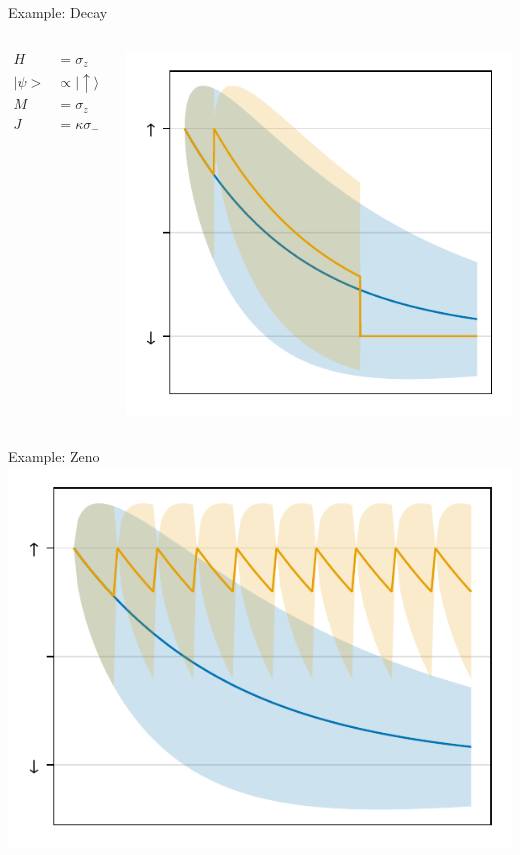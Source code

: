 \documentclass[
]{beamer}
\begin{document}
\begin{frame}{Example: Decay}
	\begin{columns}
		\begin{align*}
			H &= \sigma_z\\
			|\psi> &\propto |\uparrow\rangle\\
			M &= \sigma_z\\
			J &= \kappa\sigma_-
		\end{align*}
		
		\centering
		\vspace{-1cm}
		\includegraphics{figures/04 discreate.pdf}
	\end{columns}
\end{frame}

\begin{frame}{Example: Zeno}
	\centering
	\includegraphics{figures/04 discreate zeno.pdf}
\end{frame}
\end{document}
